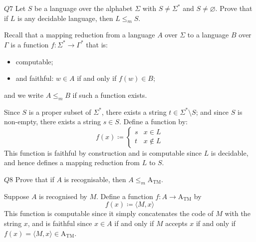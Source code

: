 \documentclass{article}
\theoremstyle{definition}
\theoremstyle{definition}
\theoremstyle{remark}
\begin{document}
\begin{questionbox}{$Q7$}
    Let $S$ be a language over the alphabet $\Sigma$ with $S\neq\Sigma^\ast$ and $S\neq\varnothing$. Prove that if $L$ is any decidable language, then $L\leq_m S$.
\end{questionbox}

\bigskip

Recall that a mapping reduction from a language $A$ over $\Sigma$ to a language $B$ over $\Gamma$ is a function $f:\Sigma^\ast\rightarrow\Gamma^\ast$ that is:
\begin{itemize}
    \item computable;
    \item and faithful: $w\in A$ if and only if $f(w)\in B$;
\end{itemize}
and we write $A\leq_m B$ if such a function exists.

\bigskip

Since $S$ is a proper subset of $\Sigma^\ast$, there exists a string $t\in\Sigma^\ast\setminus S$; and since $S$ is non-empty, there exists a string $s\in S$. Define a function by:
\begin{equation*}
    f(x)\coloneqq\begin{cases}
        s&x\in L\\
        t&x\notin L
    \end{cases}
\end{equation*}
This function is faithful by construction and is computable since $L$ is decidable, and hence defines a mapping reduction from $L$ to $S$.

\begin{questionbox}{$Q8$}
    Prove that if $A$ is recognisable, then $A\leq_m\text{A}_\text{TM}$.
\end{questionbox}

\bigskip

Suppose $A$ is recognised by $M$. Define a function $f:A\rightarrow\text{A}_\text{TM}$ by
\begin{equation*}
    f(x)\coloneqq\langle M,x\rangle
\end{equation*}
This function is computable since it simply concatenates the code of $M$ with the string $x$, and is faithful since $x\in A$ if and only if $M$ accepts $x$ if and only if $f(x)=\langle M,x\rangle\in\text{A}_\text{TM}$.
\end{document}
